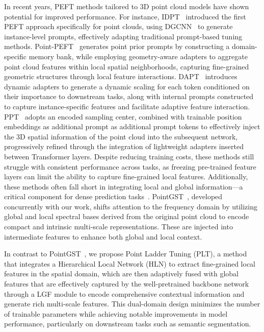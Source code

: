 In recent years, PEFT methods tailored to 3D point cloud models have shown potential for improved performance. For instance, IDPT~\cite{zha2023instance} introduced the first PEFT approach specifically for point clouds, using DGCNN~\cite{wang2019dynamic} to generate instance-level prompts, effectively adapting traditional prompt-based tuning methods. Point-PEFT~\cite{tang2024point} generates point prior prompts by constructing a domain-specific memory bank, while employing geometry-aware adapters to aggregate point cloud features within local spatial neighborhoods, capturing fine-grained geometric structures through local feature interactions. DAPT~\cite{zhou2024dynamic} introduces dynamic adapters to generate a dynamic scaling for each token conditioned on their importance to downstream tasks, along with internal prompts constructed to capture instance-specific features and facilitate adaptive feature interaction. PPT~\cite{zhang2024positional} adopts an encoded sampling center, combined with trainable position embeddings as additional prompt as additional prompt tokens to effectively inject the 3D spatial information of the point cloud into the  subsequent  network, progressively refined through the integration of lightweight adapters inserted between Transformer layers. Despite reducing training costs, these methods still struggle with consistent performance across tasks, as freezing pre-trained feature layers can limit the ability to capture fine-grained local features. Additionally, these methods often fall short in integrating local and global information—a critical component for dense prediction tasks~\cite{chen2022vitadapter}. PointGST~\cite{liang2024parameter}, developed concurrently with our work, shifts attention to the frequency domain by utilizing global and local spectral bases derived from the original point cloud to encode compact and intrinsic multi-scale representations. These are injected into intermediate features to enhance both global and local context. 

In contrast to PointGST~\cite{liang2024parameter}, we propose Point Ladder Tuning (PLT), a method that integrates a Hierarchical Local Network (HLN) to extract fine-grained local features in the spatial domain, which are then adaptively fused with global features that are effectively captured by the well-pretrained backbone network through a LGF module to encode comprehensive contextual information and generate rich multi-scale features. This dual-domain design minimizes the number of trainable parameters while achieving notable improvements in model performance, particularly on downstream tasks such as semantic segmentation.
